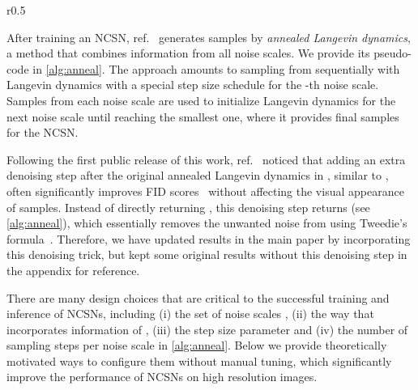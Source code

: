 \documentclass{article}
\begin{document}
\begin{wrapfigure}[15]{r}{0.5\textwidth}
\vspace{-2.2em}
\begin{minipage}{0.5\textwidth}
\begin{algorithm}[H]
	\caption{Annealed Langevin dynamics~\cite{song2019generative}}
	\label{alg:anneal}
	\begin{algorithmic}[1]
	        \State{} 
                \State{\resizebox{0.75\textwidth}{!}{}}
            \EndFor
            \State{}
        \EndFor
        \Else
        \EndIf
	\end{algorithmic}
\end{algorithm}
\end{minipage}
\end{wrapfigure}
After training an NCSN, ref.~\cite{song2019generative} generates samples by \emph{annealed Langevin dynamics}, a method that combines information from all noise scales. We provide its pseudo-code in \cref{alg:anneal}. The approach amounts to sampling from  sequentially with Langevin dynamics with a special step size schedule  for the -th noise scale. Samples from each noise scale are used to initialize Langevin dynamics for the next noise scale until reaching the smallest one, where it provides final samples for the NCSN.

Following the first public release of this work, ref.~\cite{jolicoeurpiche2020adversarial} noticed that adding an extra denoising step after the original annealed Langevin dynamics in \cite{song2019generative}, similar to \cite{saremi2019neural,li2019learning,kadkhodaie2020solving}, often significantly improves FID scores~\cite{heusel2017gans} without affecting the visual appearance of samples. Instead of directly returning , this denoising step returns  (see \cref{alg:anneal}), which essentially removes the unwanted noise  from  using Tweedie's formula~\cite{efron2011tweedie}. Therefore, we have updated results in the main paper by incorporating this denoising trick, but kept some original results without this denoising step in the appendix for reference.

There are many design choices that are critical to the successful training and inference of NCSNs, including (i) the set of noise scales , (ii) the way that  incorporates information of , (iii) the step size parameter  and (iv) the number of sampling steps per noise scale  in \cref{alg:anneal}. Below we provide theoretically motivated ways to configure them without manual tuning, which significantly improve the performance of NCSNs on high resolution images.
\end{document}
